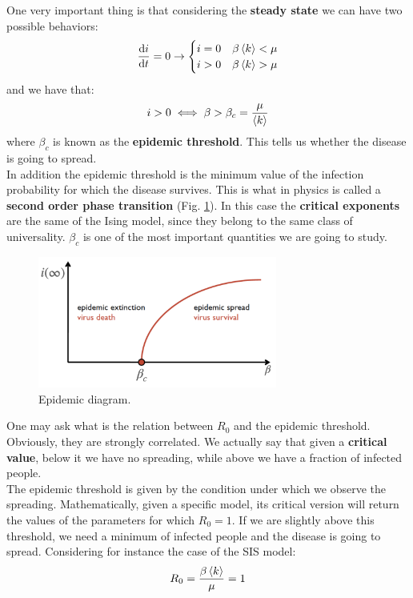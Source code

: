 \documentclass[../main/main.tex]{subfiles}
\begin{document}
One very important thing is that considering the \textbf{steady state} we can have two possible behaviors:
\begin{equation*}
  \dv{i}{t} = 0 \rightarrow  \begin{cases}
   i=0 & \beta \expval{k} < \mu  \\
   i>0 & \beta \expval{k} > \mu
  \end{cases}
\end{equation*}
and we have that:
\begin{equation}
  i>0 \iff \beta > \beta_c = \frac{\mu }{ \expval{k} }
\end{equation}
where $\beta_c$ is known as the \textbf{epidemic threshold}. This tells us whether the disease is going to spread.\\
In addition the epidemic threshold is the minimum value of the infection probability for which the disease survives. This is what in physics is called a \textbf{second order phase transition} (Fig. \ref{fig:3_5}). In this case the \textbf{critical exponents} are the same of the Ising model, since they belong to the same class of universality. $\beta_c$ is one of the most important quantities we are going to study.

\begin{figure}[h!]
\centering
\includegraphics[width=0.7\textwidth]{../lessons/image/03/5.png}
\caption{\label{fig:3_5} Epidemic diagram.}
\end{figure}

One may ask what is the relation between \( R_0 \) and the epidemic threshold. Obviously, they are strongly correlated. We actually say that given a \textbf{critical value}, below it we have no spreading, while above we have a fraction of infected people.\\
The epidemic threshold is given by the condition under which we observe the spreading. Mathematically, given a specific model, its critical version will return the values of the parameters for which $ R_0 = 1 $. If we are slightly above this threshold, we need a minimum of infected people and the disease is going to spread. Considering for instance the case of the SIS model:
\begin{equation}
  R_0 = \frac{\beta \expval{k} }{\mu } = 1
\end{equation}
\end{document}
